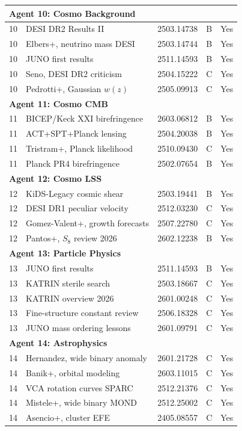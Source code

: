 \documentclass[11pt]{article}
\begin{document}
\begin{longtable}{p{}p{}p{}p{}p{}}
\multicolumn{5}{l}{\textbf{Agent 10: Cosmo Background}} \\
\midrule
10 & DESI DR2 Results II & 2503.14738 & B & Yes \\
10 & Elbers+, neutrino mass DESI & 2503.14744 & B & Yes \\
10 & JUNO first results & 2511.14593 & B & Yes \\
10 & Seno, DESI DR2 criticism & 2504.15222 & C & Yes \\
10 & Pedrotti+, Gaussian $w(z)$ & 2505.09913 & C & Yes \\
\midrule

\multicolumn{5}{l}{\textbf{Agent 11: Cosmo CMB}} \\
\midrule
11 & BICEP/Keck XXI birefringence & 2603.06812 & B & Yes \\
11 & ACT+SPT+Planck lensing & 2504.20038 & B & Yes \\
11 & Tristram+, Planck likelihood & 2510.09430 & C & Yes \\
11 & Planck PR4 birefringence & 2502.07654 & B & Yes \\
\midrule

\multicolumn{5}{l}{\textbf{Agent 12: Cosmo LSS}} \\
\midrule
12 & KiDS-Legacy cosmic shear & 2503.19441 & B & Yes \\
12 & DESI DR1 peculiar velocity & 2512.03230 & C & Yes \\
12 & Gomez-Valent+, growth forecasts & 2507.22780 & C & Yes \\
12 & Pantos+, $S_8$ review 2026 & 2602.12238 & B & Yes \\
\midrule

\multicolumn{5}{l}{\textbf{Agent 13: Particle Physics}} \\
\midrule
13 & JUNO first results & 2511.14593 & B & Yes \\
13 & KATRIN sterile search & 2503.18667 & C & Yes \\
13 & KATRIN overview 2026 & 2601.00248 & C & Yes \\
13 & Fine-structure constant review & 2506.18328 & C & Yes \\
13 & JUNO mass ordering lessons & 2601.09791 & C & Yes \\
\midrule

\multicolumn{5}{l}{\textbf{Agent 14: Astrophysics}} \\
\midrule
14 & Hernandez, wide binary anomaly & 2601.21728 & C & Yes \\
14 & Banik+, orbital modeling & 2603.11015 & C & Yes \\
14 & VCA rotation curves SPARC & 2512.21376 & C & Yes \\
14 & Mistele+, wide binary MOND & 2512.25002 & C & Yes \\
14 & Asencio+, cluster EFE & 2405.08557 & C & Yes \\
\midrule


\end{longtable}
\end{document}
